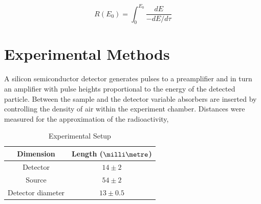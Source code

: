 \documentclass[12pt]{article}
\begin{document}
\begin{multicols}{2}
    \begin{equation}
        R(E_0) = \int_0^{E_0} \frac{dE}{-dE/d\tau}
        \label{range}
    \end{equation}

    \section{Experimental Methods}

    A silicon semiconductor detector generates pulses to a preamplifier and in turn an amplifier with pulse heights proportional to the energy of the detected particle. Between the sample and the detector variable absorbers are inserted by controlling the density of air within the experiment chamber. Distances were measured for the approximation of the radioactivity,
    \begin{table}[H]
        \begin{center}
            \begin{tabular}{| c | c | }
                \hline
                Dimension & Length ($\milli\metre$) \\
                \hline
                Detector & $14 \pm 2$ \\
                Source & $54 \pm 2$ \\
                Detector diameter & $13 \pm 0.5$ \\
                \hline
            \end{tabular}
        \end{center}
        \caption{Experimental Setup}
        \label{table:1}
    \end{table}


\end{multicols}
\end{document}
